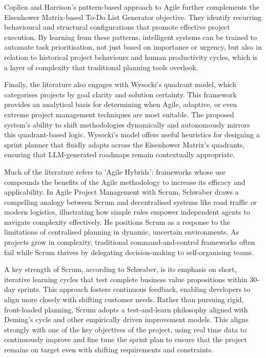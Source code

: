 \documentclass{report}
\begin{document}
Coplien and Harrison's pattern-based approach to Agile further complements the Eisenhower Matrix-based To-Do List Generator objective. They identify recurring behavioural and structural configurations that promote effective project execution. By learning from these patterns, intelligent systems can be trained to automate task prioritisation, not just based on importance or urgency, but also in relation to historical project behaviours and human productivity cycles, which is a layer of complexity that traditional planning tools overlook.

Finally, the literature also engages with Wysocki's quadrant model, which categorises projects by goal clarity and solution certainty. This framework provides an analytical basis for determining when Agile, adaptive, or even extreme project management techniques are most suitable. The proposed system's ability to shift methodologies dynamically and autonomously mirrors this quadrant-based logic. Wysocki's model offers useful heuristics for designing a sprint planner that fluidly adapts across the Eisenhower Matrix's quadrants, ensuring that LLM-generated roadmaps remain contextually appropriate.

Much of the literature refers to 'Agile Hybrids': frameworks whose use compounds the benefits of the Agile methodology to increase its efficacy and applicability. In Agile Project Management with Scrum, Schwaber \parencite{schwaberAgileProjectManagement2004} draws a compelling analogy between Scrum and decentralised systems like road traffic or modern logistics, illustrating how simple rules empower independent agents to navigate complexity effectively. He positions Scrum as a response to the limitations of centralised planning in dynamic, uncertain environments. As projects grow in complexity, traditional command-and-control frameworks often fail while Scrum thrives by delegating decision-making to self-organising teams.

A key strength of Scrum, according to Schwaber, is its emphasis on short, iterative learning cycles that test complete business value propositions within 30-day sprints. This approach fosters continuous feedback, enabling developers to align more closely with shifting customer needs. Rather than pursuing rigid, front-loaded planning, Scrum adopts a test-and-learn philosophy aligned with Deming's cycle and other empirically driven improvement models. This aligns strongly with one of the key objectives of the project, using real time data to continuously improve and fine tune the sprint plan to ensure that the project remains on target even with shifting requirements and constraints.
\end{document}
